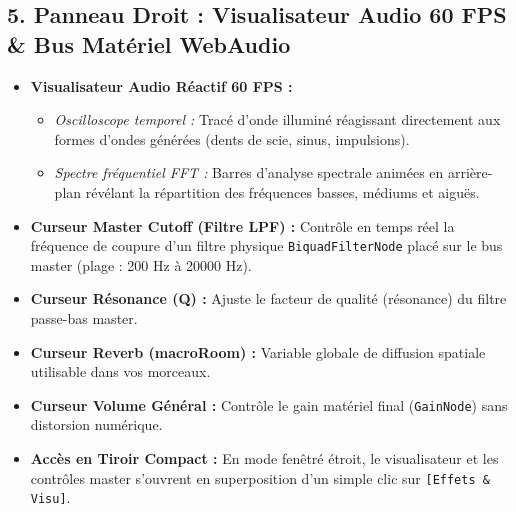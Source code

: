 \documentclass[a4paper,10pt]{article}
\begin{document}
\subsection{5. Panneau Droit : Visualisateur Audio 60 FPS \& Bus Matériel WebAudio}
\begin{itemize}
    \item \textbf{Visualisateur Audio Réactif 60 FPS :}
    \begin{itemize}
        \item \textit{Oscilloscope temporel :} Tracé d'onde illuminé réagissant directement aux formes d'ondes générées (dents de scie, sinus, impulsions).
        \item \textit{Spectre fréquentiel FFT :} Barres d'analyse spectrale animées en arrière-plan révélant la répartition des fréquences basses, médiums et aiguës.
    \end{itemize}
    \item \textbf{Curseur Master Cutoff (Filtre LPF) :} Contrôle en temps réel la fréquence de coupure d'un filtre physique \texttt{BiquadFilterNode} placé sur le bus master (plage : 200 Hz à 20000 Hz).
    \item \textbf{Curseur Résonance (Q) :} Ajuste le facteur de qualité (résonance) du filtre passe-bas master.
    \item \textbf{Curseur Reverb (macroRoom) :} Variable globale de diffusion spatiale utilisable dans vos morceaux.
    \item \textbf{Curseur Volume Général :} Contrôle le gain matériel final (\texttt{GainNode}) sans distorsion numérique.
    \item \textbf{Accès en Tiroir Compact :} En mode fenêtré étroit, le visualisateur et les contrôles master s'ouvrent en superposition d'un simple clic sur \texttt{[Effets \& Visu]}.
\end{itemize}
\end{document}

